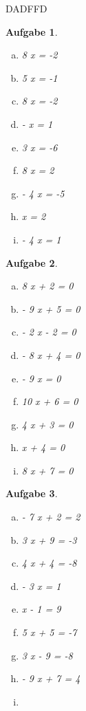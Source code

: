 \documentclass[12pt,fleqn]{article}
\theoremstyle{aufg}
\newtheorem{aufgabe}{Aufgabe}
\theoremstyle{bsp}
\begin{document}
\begin{flushleft}
DADFFD
\begin{aufgabe} ~ \\
\begin{multicols}{3} 
\begin{enumerate}[a)] 
\item 
8 x = -2
\item 
5 x = -1
\item 
8 x = -2
\item 
- x = 1
\item 
3 x = -6
\item 
8 x = 2
\item 
- 4 x = -5
\item 
x = 2
\item 
- 4 x = 1
\end{enumerate} 
\end{multicols} 
\end{aufgabe} 
\begin{aufgabe} ~ \\ 
\begin{multicols}{3} 
\begin{enumerate}[a)] 
\item 
8 x + 2 = 0
\item 
- 9 x + 5 = 0
\item 
- 2 x - 2 = 0
\item 
- 8 x + 4 = 0
\item 
- 9 x = 0
\item 
10 x + 6 = 0
\item 
4 x + 3 = 0
\item 
x + 4 = 0
\item 
8 x + 7 = 0
\end{enumerate} 
\end{multicols} 
\end{aufgabe} 
\begin{aufgabe} ~ \\ 
\begin{multicols}{3} 
\begin{enumerate}[a)] 
\item 
- 7 x + 2 = 2
\item 
3 x + 9 = -3
\item 
4 x + 4 = -8
\item 
- 3 x = 1
\item 
x - 1 = 9
\item 
5 x + 5 = -7
\item 
3 x - 9 = -8
\item 
- 9 x + 7 = 4
\item 

\end{enumerate}
\end{multicols}
\end{aufgabe}
\end{flushleft}
\end{document}
